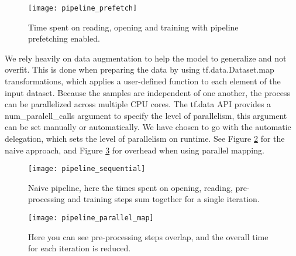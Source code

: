 \documentclass[thesis.tex]{subfiles}
\begin{document}
\begin{figure} %
  \begin{center}
    \texttt{[image: pipeline\_prefetch]}
    \caption[Pipeline with prefetching.]{Time spent on reading, opening and training with pipeline prefetching enabled.}
    \label{fig:pipeline_prefetch}
  \end{center}
\end{figure}

We rely heavily on data augmentation to help the model to generalize and not overfit. This is done when preparing the data by using tf.data.Dataset.map transformations, which applies a user-defined function to each element of the input dataset. Because the samples are independent of one another, the process can be parallelized across multiple CPU cores. The tf.data API provides a num\_paralell\_calls argument to specify the level of parallelism, this argument can be set manually or automatically. We have chosen to go with the automatic delegation, which sets the level of parallelism on runtime. See Figure \ref{fig:pipeline_sequential} for the naive approach, and Figure \ref{fig:pipeline_parallel_map} for overhead when using parallel mapping.

\begin{figure} %
  \begin{center}
    \texttt{[image: pipeline\_sequential]}
    \caption[Naive pipeline with mapping.]{Naive pipeline, here the times spent on opening, reading, pre-processing and training steps sum together for a single iteration.}
    \label{fig:pipeline_sequential}
  \end{center}
\end{figure}

\begin{figure} %
  \begin{center}
    \texttt{[image: pipeline\_parallel\_map]}
    \caption[Pipeline with parallel mapping.]{Here you can see pre-processing steps overlap, and the overall time for each iteration is reduced.}
    \label{fig:pipeline_parallel_map}
  \end{center}
\end{figure}
\end{document}
